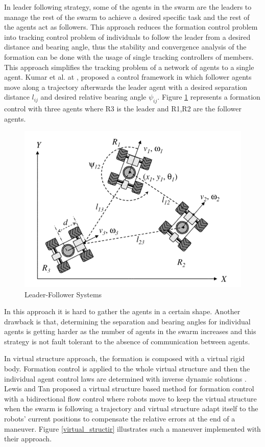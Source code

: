 In leader following strategy, some of the agents in the swarm are the leaders to manage the rest of the swarm to achieve a desired specific task and the rest of the agents act as followers. This approach reduces the formation control problem into tracking control problem of individuals to follow the leader from a desired distance and bearing angle, thus the stability and convergence analysis of the formation can be done with the usage of single tracking controllers of members. This approach simplifies the tracking problem of a network of agents to a single agent. Kumar et al. at \cite{18}, proposed a control framework in which follower agents move along a trajectory afterwards the leader agent with a desired separation distance $l_{ij}$ and desired relative bearing angle $\psi_{ij}$.  Figure \ref{leader_follower_ref} represents a formation control with three agents where R3 is the leader and R1,R2 are the follower agents. 

\begin{figure}[H]
	\caption{Leader-Follower Systems \cite{18}} \label{leader_follower_ref}
	\centering
	\includegraphics[scale = 0.5]{leader}
\end{figure}


In this approach it is hard to gather the agents in a certain shape. Another drawback is that, determining the separation and bearing angles for individual agents is getting harder as the number of agents in the swarm increases and this strategy is not fault tolerant to the absence of communication between agents.


In virtual structure approach, the formation is composed with a virtual rigid body. Formation control is applied to the whole virtual structure and then the individual agent control laws are determined with inverse dynamic solutions \cite{12}.  Lewis and Tan \cite{23} proposed a virtual structure based method for formation control  with a bidirectional flow control where robots move to keep the virtual structure when the swarm is following a trajectory and virtual structure adapt itself to the robots' current positions to compensate the relative errors at the end of a maneuver. Figure \ref{virtual_structir} illustrates such a maneuver implemented with their approach.

